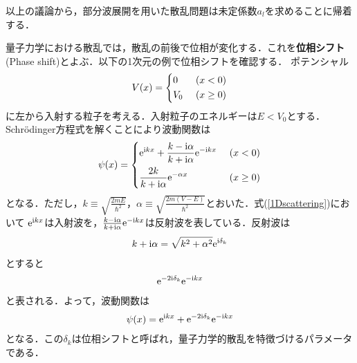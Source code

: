 \documentclass{report}
\begin{document}
  以上の議論から，部分波展開を用いた散乱問題は未定係数$a_l$を求めることに帰着する．

  量子力学における散乱では，散乱の前後で位相が変化する．これを\textbf{位相シフト}(Phase shift)とよぶ．以下の1次元の例で位相シフトを確認する．
  ポテンシャル
  \begin{align}
    V(x) = 
    \begin{dcases}
      0\ &(x < 0)\\
      V_0\ &(x \geq 0)
    \end{dcases}
  \end{align}
  に左から入射する粒子を考える．入射粒子のエネルギーは$E<V_0$とする．Schrödinger方程式を解くことにより波動関数は
  \begin{align}
    \psi(x) = 
    \begin{dcases}
      \label{1Dscattering}
      \mathrm{e}^{\mathrm{i} kx} + \frac{k -\mathrm{i}\alpha}{k + \mathrm{i}\alpha} \mathrm{e}^{-\mathrm{i} kx}\ &(x < 0)\\
      \frac{2k}{k + \mathrm{i}\alpha}\mathrm{e}^{-\alpha x}\ &(x \geq 0)
    \end{dcases}
  \end{align}
  となる．ただし，$k \equiv \sqrt{\frac{2mE}{\hbar^2}}，\alpha \equiv \sqrt{\frac{2m(V-E)}{\hbar^2}}$とおいた．式(\ref{1Dscattering})において
  $\mathrm{e}^{\mathrm{i} kx}$は入射波を，$\frac{k -\mathrm{i}\alpha}{k + \mathrm{i}\alpha} \mathrm{e}^{-\mathrm{i} kx}$は反射波を表している．反射波は
  \begin{align}
    k + \mathrm{i}\alpha = \sqrt{k^2 + \alpha^2} \mathrm{e}^{\mathrm{i}\delta_k}
  \end{align}
  とすると
  \begin{align}
    \mathrm{e}^{-2 \mathrm{i} \delta_k}\mathrm{e}^{-\mathrm{i} kx}
  \end{align}
  と表される．よって，波動関数は
  \begin{align}
    \psi(x) = \mathrm{e}^{\mathrm{i} kx} + \mathrm{e}^{-2 \mathrm{i} \delta_k}\mathrm{e}^{-\mathrm{i} kx}
  \end{align}
  となる．この$\delta_k$は位相シフトと呼ばれ，量子力学的散乱を特徴づけるパラメータである．
\end{document}
